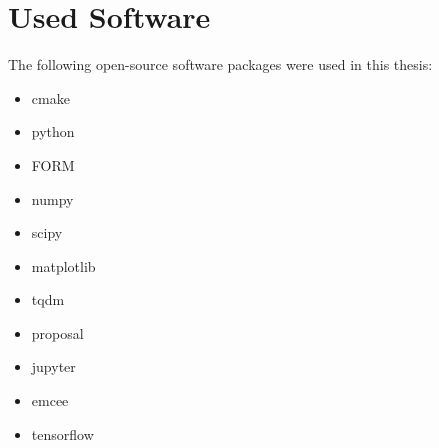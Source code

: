 \chapter{Used Software}

The following open-source software packages were used in this thesis:
\begin{itemize}
    \item cmake \cite{cmake}
    \item python \cite{python3}
    \item FORM \cite{Vermaseren00Form}
    \item numpy \cite{NumPy}
    \item scipy \cite{SciPy}
    \item matplotlib \cite{Matplotlib}
    \item tqdm \cite{tqdm}
    \item proposal \cite{proposal_zenodo}
    \item jupyter \cite{ipython}
    \item emcee \cite{emcee}
    \item tensorflow \cite{tensorflow}
\end{itemize}
